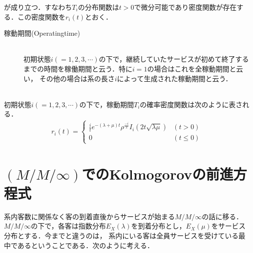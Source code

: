 \documentclass[a4j,papersize,disablejfam,slide,14pt]{jsarticle}
\def\exp#1{e^{#1}} %
\begin{document}
    が成り立つ．すなわち$T_i$の分布関数は$t>0$で微分可能であり密度関数が存在する．この密度関数を$r_i(t)$とおく．
    \begin{screen}
    	\begin{description}
        	\item[稼動期間{\rm (Operating\quad time)}]\mbox{}\\
            	初期状態$i (= 1,2,3,\cdots)$の下で，継続していたサービスが初めて終了するまでの時間を稼働期間と云う．特に$i=1$の場合はこれを全稼動期間と云い，
                その他の場合は系の長さ$i$によって生成された稼動期間と云う．
        \end{description}
        \mbox{}\\
    	初期状態$i (= 1,2,3,\cdots)$の下で，稼動期間$T_i$の確率密度関数は次のように表される．
    	\begin{align}
        	r_i(t) =
            \begin{cases}	
            	\frac{i}{t} \exp{-(\lambda + \mu)t} \rho^{\frac{-i}{2}} I_{i}(2t\sqrt{\lambda \mu}) & (t > 0) \\
                0 & (t \leq 0)
            \end{cases}
        \end{align}
    \end{screen}

\section{$(M/M/\infty)$での{\rm Kolmogorov}の前進方程式}
	系内客数に関係なく客の到着直後からサービスが始まる$M/M/\infty$の話に移る．
    $M/M/\infty$の下で，各客は指数分布$E_X(\lambda)$を到着分布とし，$E_X(\mu)$をサービス分布とする．今までと違うのは，
    系内にいる客は全員サービスを受けている最中であるということである．次のように考える．\\
    
\end{document}
